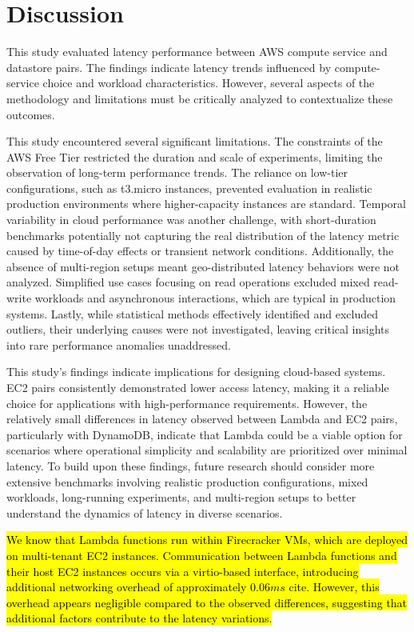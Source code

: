 \section{Discussion}
\label{cha:discuss}

This study evaluated latency performance between AWS compute service and datastore pairs. The findings indicate latency trends influenced by compute-service choice and workload characteristics. However, several aspects of the methodology and limitations must be critically analyzed to contextualize these outcomes.

This study encountered several significant limitations. The constraints of the AWS Free Tier restricted the duration and scale of experiments, limiting the observation of long-term performance trends. The reliance on low-tier configurations, such as t3.micro instances, prevented evaluation in realistic production environments where higher-capacity instances are standard. Temporal variability in cloud performance was another challenge, with short-duration benchmarks potentially not capturing the real distribution of the latency metric caused by time-of-day effects or transient network conditions. Additionally, the absence of multi-region setups meant geo-distributed latency behaviors were not analyzed. Simplified use cases focusing on read operations excluded mixed read-write workloads and asynchronous interactions, which are typical in production systems. Lastly, while statistical methods effectively identified and excluded outliers, their underlying causes were not investigated, leaving critical insights into rare performance anomalies unaddressed.

This study's findings indicate implications for designing cloud-based systems. EC2 pairs consistently demonstrated lower access latency, making it a reliable choice for applications with high-performance requirements. However, the relatively small differences in latency observed between Lambda and EC2 pairs, particularly with DynamoDB, indicate that Lambda could be a viable option for scenarios where operational simplicity and scalability are prioritized over minimal latency. To build upon these findings, future research should consider more extensive benchmarks involving realistic production configurations, mixed workloads, long-running experiments, and multi-region setups to better understand the dynamics of latency in diverse scenarios.

\hl{We know that Lambda functions run within Firecracker VMs, which are deployed on multi-tenant EC2 instances. Communication between Lambda functions and their host EC2 instances occurs via a virtio-based interface, introducing additional networking overhead of approximately $0.06ms$ cite{}. However, this overhead appears negligible compared to the observed differences, suggesting that additional factors contribute to the latency variations.}